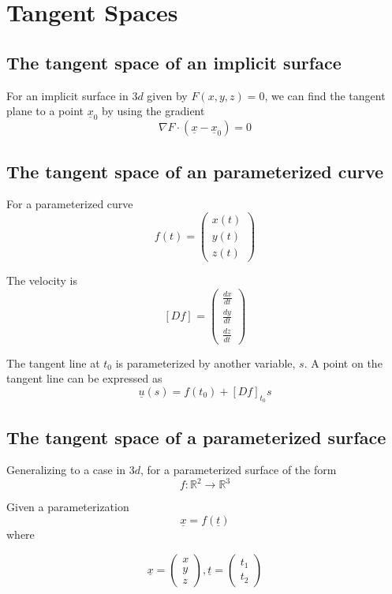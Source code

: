 \section{Tangent Spaces}

\subsection{The tangent space of an implicit surface}

For an implicit surface in $3d$ given by $F(x, y, z) = 0$, we can find the tangent plane to a point $ \underline{x}_0$ by using the gradient
\[
  \nabla F \cdot ( \underline{x} - \underline{x}_0) = 0
\] 

\subsection{The tangent space of an parameterized curve}

For a parameterized curve
\[
  f(t) =  \begin{pmatrix} 
    x(t) \\ y(t) \\ z(t)  
  \end{pmatrix}
\] 

The velocity is
\[
  \left[ D f \right]_{}  = \begin{pmatrix} 
    \frac{dx}{dt} \\ \frac{dy}{dt} \\ \frac{dz}{dt}  
  \end{pmatrix}
\] 

The tangent line at $t_0$ is parameterized by another variable, $s$. A point on the tangent line can be expressed as 
\[
  \underline{u}(s) = f(t_0) + \left[ D f \right]_{t_0} s
\] 

\subsection{The tangent space of a parameterized surface}

Generalizing to a case in $3d$, for a parameterized surface of the form
\[
  f: \mathbb{R}^2 \rightarrow \mathbb{R}^3
\] 

Given a parameterization
\[
  \underline{x} = f( \underline{t})  
\]  where

\[
  \underline{x} = \begin{pmatrix} x \\ y\\ z \end{pmatrix} , \underline{t} = \begin{pmatrix} t_1 \\t_2 \end{pmatrix} 
\] 

